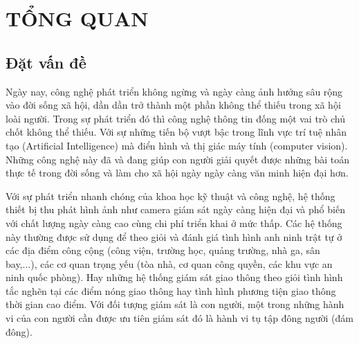  \pagebreak[4]
 \hspace*{1cm}
 \pagebreak[4]
 \hspace*{1cm}
 \pagebreak[4]

\chapter{TỔNG QUAN}
\ifpdf
    \graphicspath{{Chapter1/Chapter1Figs/PNG/}{Chapter1/Chapter1Figs/PDF/}{Chapter1/Chapter1Figs/}}
\else
    \graphicspath{{Chapter1/Chapter1Figs/EPS/}{Chapter1/Chapter1Figs/}}
\fi

  
\section{Đặt vấn đề}
	Ngày nay, công nghệ phát triển không ngừng và ngày càng ảnh hưởng sâu rộng vào đời sống xã hội, dần dần trở thành một phần không thể thiếu trong xã hội loài người. Trong sự phát triển đó thì công nghệ thông tin đống một vai trò chủ chốt không thể thiếu. Với sự những tiến bộ vượt bậc trong lĩnh vực trí tuệ nhân tạo (Artificial Intelligence) mà điển hình và thị giác máy tính (computer vision). Những công nghệ này đã và đang giúp con người giải quyết được những bài toán thực tế trong đời sống và làm cho xã hội ngày ngày càng văn minh hiện đại hơn.\par
	Với sự phát triển nhanh chóng của khoa học kỹ thuật và công nghệ, hệ thống thiết bị thu phát hình ảnh như camera giám sát ngày càng hiện đại và phổ biến với chất lượng ngày càng cao cùng chi phí triển khai ở mức thấp. Các hệ thống này thường được sử dụng để theo giỏi và đánh giá tình hình anh ninh trật tự ở các địa điểm công cộng (công viện, trường học, quảng trường, nhà ga, sân bay,...), các cơ quan trọng yếu (tòa nhà, cơ quan công quyền, các khu vực an ninh quốc phòng). Hay những hệ thống giám sát giao thông theo giỏi tình hình tắc nghẽn tại các điểm nóng giao thông hay tình hình phương tiện giao thông thời gian cao điểm. Với đối tượng giám sát là con người, một trong những hành vi của con người cần được ưu tiên giám sát đó là hành vi tụ tập đông người (đám đông). \par
